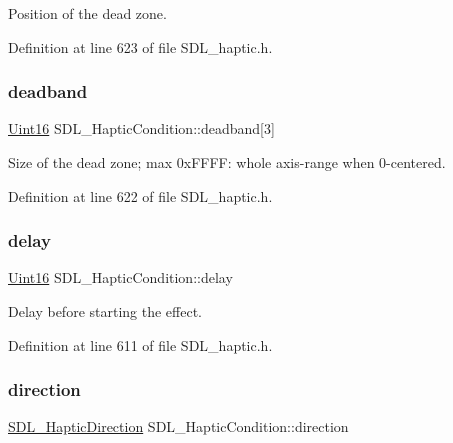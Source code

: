 Position of the dead zone. 

Definition at line 623 of file S\+D\+L\+\_\+haptic.\+h.

\mbox{\label{struct_s_d_l___haptic_condition_af684c8eeeb719739a32723c00c5a2bbd}} 
\subsubsection{\texorpdfstring{deadband}{deadband}}
{\footnotesize\ttfamily \mbox{\hyperlink{_s_d_l__stdinc_8h_a31fcc0a076c9068668173ee26d33e42b}{Uint16}} S\+D\+L\+\_\+\+Haptic\+Condition\+::deadband\mbox{[}3\mbox{]}}

Size of the dead zone; max 0x\+F\+F\+FF\+: whole axis-\/range when 0-\/centered. 

Definition at line 622 of file S\+D\+L\+\_\+haptic.\+h.

\mbox{\label{struct_s_d_l___haptic_condition_aad40417980530ca8d80c62ba864a090b}} 
\subsubsection{\texorpdfstring{delay}{delay}}
{\footnotesize\ttfamily \mbox{\hyperlink{_s_d_l__stdinc_8h_a31fcc0a076c9068668173ee26d33e42b}{Uint16}} S\+D\+L\+\_\+\+Haptic\+Condition\+::delay}

Delay before starting the effect. 

Definition at line 611 of file S\+D\+L\+\_\+haptic.\+h.

\mbox{\label{struct_s_d_l___haptic_condition_a728507d30d18998949313de3a25e5581}} 
\subsubsection{\texorpdfstring{direction}{direction}}
{\footnotesize\ttfamily \mbox{\hyperlink{struct_s_d_l___haptic_direction}{S\+D\+L\+\_\+\+Haptic\+Direction}} S\+D\+L\+\_\+\+Haptic\+Condition\+::direction}

